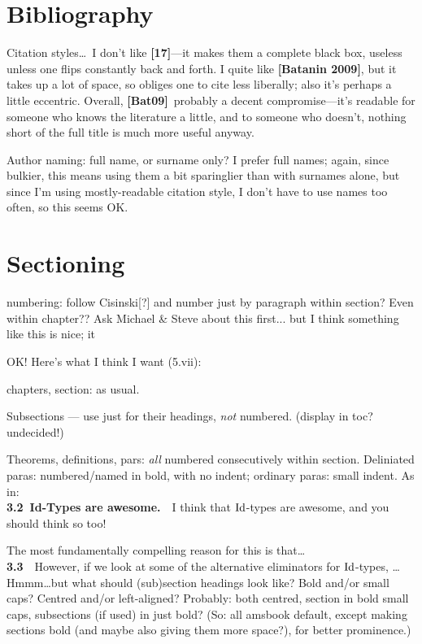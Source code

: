 \documentclass{amsart}
\begin{document}
\section{Bibliography}

Citation styles\ldots\ I don't like \textbf{[17]}---it makes them a complete black box, useless unless one flips constantly back and forth.  I quite like \textbf{[Batanin 2009]}, but it takes up a lot of space, so obliges one to cite less liberally; also it's perhaps a little eccentric.  Overall, \textbf{[Bat09]}\ probably a decent compromise---it's readable for someone who knows the literature a little, and to someone who doesn't, nothing short of the full title is much more useful anyway.

Author naming: full name, or surname only?  I prefer full names; again, since bulkier, this means using them a bit sparinglier than with surnames alone, but since I'm using mostly-readable citation style, I don't have to use names too often, so this seems OK.

\section{Sectioning}  numbering: follow Cisinski[?] and number just by paragraph within section?  Even within chapter??  Ask Michael \& Steve about this first...  but I think something like this is nice; it 

OK!  Here's what I think I want (5.vii):

chapters, section: as usual.

Subsections --- use just for their headings, \emph{not} numbered.  (display in toc?  undecided!)

Theorems, definitions, pars: \emph{all} numbered consecutively within section.
Deliniated paras: numbered/named in bold, with no indent; ordinary paras: small indent.  As in: \\

\noindent \textbf{3.2\ Id-Types are awesome.}\ \ I think that $\mathrm{Id}$-types are awesome, and you should think so too!

The most fundamentally compelling reason for this is that\ldots \\
  
\noindent \textbf{3.3}\ \ However, if we look at some of the alternative eliminators for $\mathrm{Id}$-types, \ldots \\

Hmmm\ldots but what should (sub)section headings look like?  Bold and/or small caps?  Centred and/or left-aligned?  Probably: both centred, section in bold small caps, subsections (if used) in just bold?  (So: all amsbook default, except making sections bold (and maybe also giving them more space?), for better prominence.)
\end{document}
